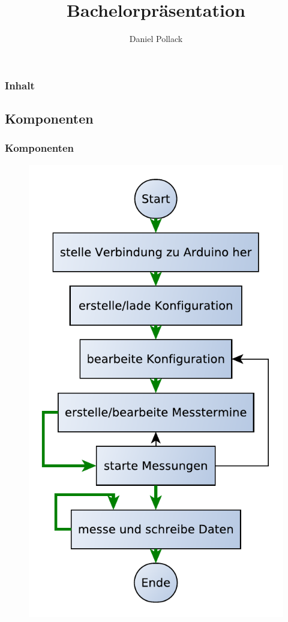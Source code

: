 \documentclass{beamer}
\author{Daniel Pollack}
\title{Bachelorpräsentation}
\institute{Bauhaus-Universität Weimar\\Lehrstuhl: Human-Computer Interaction}
\begin{document}
\begin{frame}
 \titlepage
\end{frame}

\begin{frame}
 \frametitle{Inhalt}
 \tableofcontents
\end{frame}

\begin{frame}
 \section{Komponenten}
 \frametitle{Komponenten}
\begin{figure}
 \centering
 \includegraphics[height=\textheight,keepaspectratio=true]{./pics/SoftwareFlowChart2.pdf}
\end{figure}
\end{frame}
\end{document}
